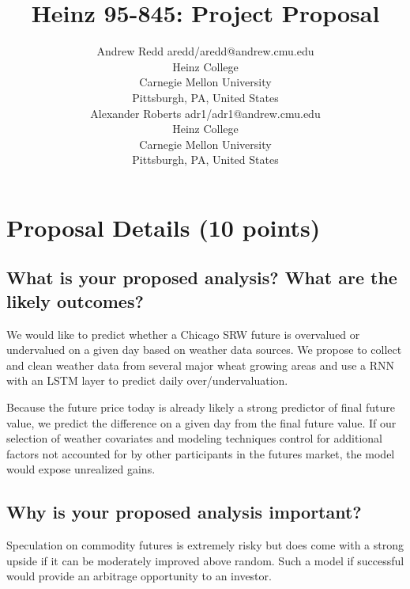 \documentclass[twoside,11pt]{article}
\begin{document}
\title{Heinz 95-845: Project Proposal}

\author{\name Andrew Redd \email aredd/aredd@andrew.cmu.edu \\
       \addr Heinz College\\
       Carnegie Mellon University\\
       Pittsburgh, PA, United States \\
       \AND
       \name Alexander Roberts \email adr1/adr1@andrew.cmu.edu \\
       \addr Heinz College\\
       Carnegie Mellon University\\
       Pittsburgh, PA, United States}
\maketitle

\section{Proposal Details (10 points)} \label{details}

\subsection{What is your proposed analysis? What are the likely outcomes?}

We would like to predict whether a Chicago SRW future is overvalued or undervalued on a given day based on weather data sources. We propose to collect and clean weather data from several major wheat growing areas and use a RNN with an LSTM layer to predict daily over/undervaluation. 

Because the future price today is already likely a strong predictor of final future value, we predict the difference on a given day from the final future value. If our selection of weather covariates and modeling techniques control for additional factors not accounted for by other participants in the futures market, the model would expose unrealized gains.  

\subsection{Why is your proposed analysis important?}

Speculation on commodity futures is extremely risky but does come with a strong upside if it can be moderately improved above random. Such a model if successful would provide an arbitrage opportunity to an investor. 
\end{document}

